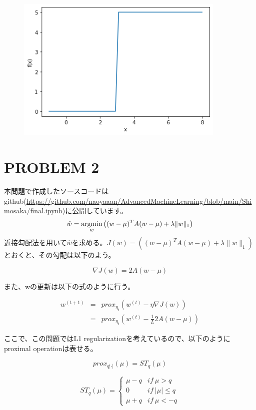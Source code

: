 \documentclass[a4j,11pt]{jarticle}
\newcommand{\argmin}{\mathop{\rm argmin}\limits}
\begin{document}
\begin{figure}
    \centering
    \includegraphics[width=10cm]{p1-4.png}
\end{figure}


\newpage
\section{PROBLEM 2}
本問題で作成したソースコードはgithub(\url{https://github.com/naoyaaan/AdvancedMachineLearning/blob/main/Shimosaka/final.ipynb})に公開しています。
\begin{equation}
    \hat{w} = \argmin_{w} \left((w-\mu)^{T}A(w-\mu)+\lambda \|w\|_1\right)
\end{equation}
近接勾配法を用いて$\hat{w}$を求める。$J(w) = \left((w-\mu)^{T}A(w-\mu)+\lambda \|w\|_1\right)$とおくと、その勾配は以下のよう。

\begin{equation}
    \nabla J(w) = 2A(w-\mu)
\end{equation}

また、wの更新は以下の式のように行う。

\begin{eqnarray}
    w^{(t+1)} &=& prox_{\eta_t} \left(w^{(t)} - \eta\nabla J(w)\right)\\
    &=& prox_{\eta_t} \left(w^{(t)} - \frac{1}{L}2A(w-\mu)\right)
\end{eqnarray}

ここで、この問題ではL1 regularizationを考えているので、以下のようにproximal operationは表せる。

\begin{equation}
    prox_{q|\cdot|}(\mu) = ST_q(\mu)
\end{equation}

\begin{equation}
    ST_q(\mu) = \begin{cases}
        \mu-q & if~\mu > q \\
        0 & if~|\mu| \leq q \\
        \mu+q & if~\mu < -q
    \end{cases}
\end{equation}
\end{document}
